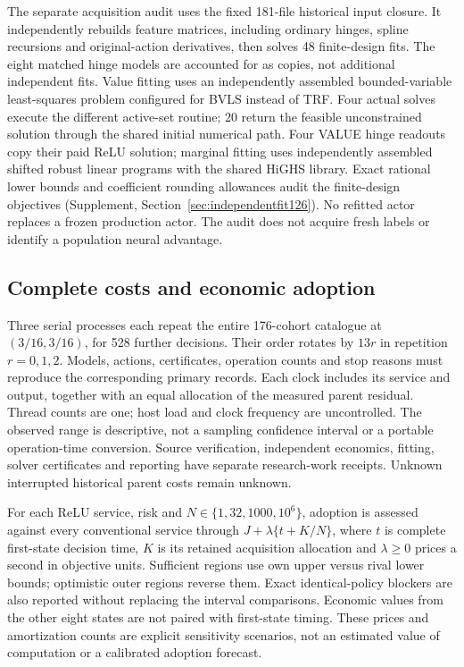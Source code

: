 The separate acquisition audit uses the fixed 181-file historical input
closure. It independently rebuilds feature matrices, including ordinary
hinges, spline recursions and original-action derivatives, then solves 48
finite-design fits. The eight matched hinge models are accounted for as copies,
not additional independent fits. Value fitting uses an independently assembled
bounded-variable least-squares problem configured for BVLS instead of TRF.
Four actual solves execute the different active-set routine; 20 return the
feasible unconstrained solution through the shared initial numerical path.
Four VALUE hinge readouts copy their paid ReLU solution;
marginal fitting uses independently assembled shifted robust linear programs
with the shared HiGHS library. Exact rational lower bounds and coefficient
rounding allowances audit the finite-design objectives
(Supplement, Section~\ref{sec:independentfit126}). No refitted actor replaces
a frozen production actor. The audit does not acquire fresh labels or identify
a population neural advantage.

\subsection{Complete costs and economic adoption}

Three serial processes each repeat the entire 176-cohort catalogue at
$(3/16,3/16)$, for 528 further decisions. Their order rotates by $13r$ in
repetition $r=0,1,2$. Models, actions, certificates, operation counts and stop
reasons must reproduce the corresponding primary records. Each clock includes
its service and output, together with an equal allocation of the measured
parent residual. Thread counts are one; host load and clock frequency are
uncontrolled. The observed range is descriptive, not a sampling confidence
interval or a portable operation-time conversion. Source verification,
independent economics, fitting, solver certificates and reporting have separate
research-work receipts. Unknown interrupted historical parent costs remain
unknown.

For each ReLU service, risk and $N\in\{1,32,1000,10^6\}$, adoption is
assessed against every conventional service through
$J+\lambda\{t+K/N\}$, where $t$ is complete first-state decision time,
$K$ is its retained acquisition allocation and $\lambda\ge0$ prices a second
in objective units. Sufficient regions use own upper versus rival lower
bounds; optimistic outer regions reverse them. Exact identical-policy blockers
are also reported without replacing the interval comparisons. Economic values
from the other eight states are not paired with first-state timing. These
prices and amortization counts are explicit sensitivity scenarios, not an
estimated value of computation or a calibrated adoption forecast.
